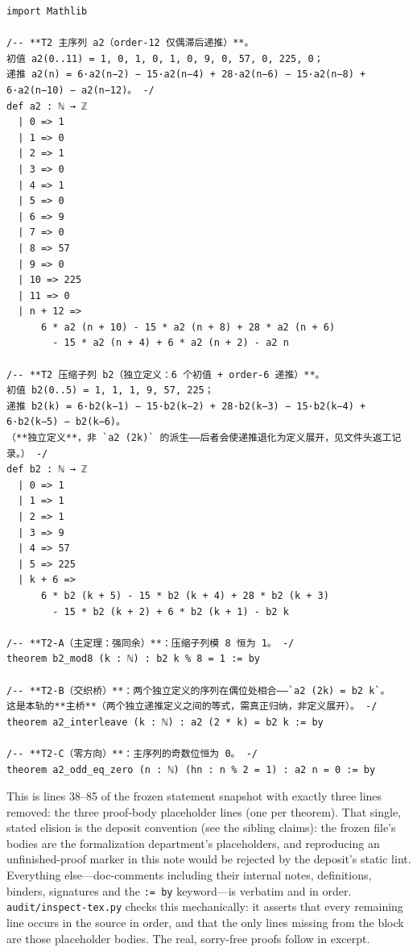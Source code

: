\documentclass[11pt]{article}
\begin{document}
\begin{lstlisting}[caption={Frozen formal statement (Lean 4, verbatim from \texttt{formalized/02-mod3x3-statements.lean}, lines 38--85), with the three proof-body placeholder lines omitted (see the note below the listing). sha256 \texttt{da4eae94}...).},label={lst:stmt}]
import Mathlib

/-- **T2 主序列 a2（order-12 仅偶滞后递推）**。
初值 a2(0..11) = 1, 0, 1, 0, 1, 0, 9, 0, 57, 0, 225, 0；
递推 a2(n) = 6·a2(n−2) − 15·a2(n−4) + 28·a2(n−6) − 15·a2(n−8) + 6·a2(n−10) − a2(n−12)。 -/
def a2 : ℕ → ℤ
  | 0 => 1
  | 1 => 0
  | 2 => 1
  | 3 => 0
  | 4 => 1
  | 5 => 0
  | 6 => 9
  | 7 => 0
  | 8 => 57
  | 9 => 0
  | 10 => 225
  | 11 => 0
  | n + 12 =>
      6 * a2 (n + 10) - 15 * a2 (n + 8) + 28 * a2 (n + 6)
        - 15 * a2 (n + 4) + 6 * a2 (n + 2) - a2 n

/-- **T2 压缩子列 b2（独立定义：6 个初值 + order-6 递推）**。
初值 b2(0..5) = 1, 1, 1, 9, 57, 225；
递推 b2(k) = 6·b2(k−1) − 15·b2(k−2) + 28·b2(k−3) − 15·b2(k−4) + 6·b2(k−5) − b2(k−6)。
（**独立定义**，非 `a2 (2k)` 的派生——后者会使递推退化为定义展开，见文件头返工记录。） -/
def b2 : ℕ → ℤ
  | 0 => 1
  | 1 => 1
  | 2 => 1
  | 3 => 9
  | 4 => 57
  | 5 => 225
  | k + 6 =>
      6 * b2 (k + 5) - 15 * b2 (k + 4) + 28 * b2 (k + 3)
        - 15 * b2 (k + 2) + 6 * b2 (k + 1) - b2 k

/-- **T2-A（主定理：强同余）**：压缩子列模 8 恒为 1。 -/
theorem b2_mod8 (k : ℕ) : b2 k % 8 = 1 := by

/-- **T2-B（交织桥）**：两个独立定义的序列在偶位处相合——`a2 (2k) = b2 k`。
这是本轨的**主桥**（两个独立递推定义之间的等式，需真正归纳，非定义展开）。 -/
theorem a2_interleave (k : ℕ) : a2 (2 * k) = b2 k := by

/-- **T2-C（零方向）**：主序列的奇数位恒为 0。 -/
theorem a2_odd_eq_zero (n : ℕ) (hn : n % 2 = 1) : a2 n = 0 := by
\end{lstlisting}

\noindent This is lines 38--85 of the frozen statement snapshot with exactly three lines
removed: the three proof-body placeholder lines (one per theorem). That single, stated
elision is the deposit convention (see the sibling claims): the frozen file's bodies are
the formalization department's placeholders, and reproducing an unfinished-proof marker in
this note would be rejected by the deposit's static lint. Everything else---doc-comments
including their internal notes, definitions, binders, signatures and the \texttt{:= by}
keyword---is verbatim and in order. \texttt{audit/inspect-tex.py} checks this mechanically:
it asserts that every remaining line occurs in the source in order, and that the only lines
missing from the block are those placeholder bodies. The real, sorry-free proofs follow in
excerpt.
\end{document}
